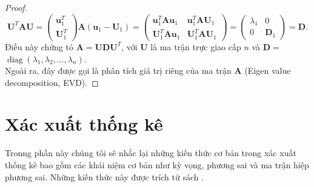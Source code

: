 \documentclass[12pt,a4paper,oneside]{report}
\numberwithin{equation}{section}
\begin{document}
\begin{proof}
	$$
	\mathbf{U}^{T} \mathbf{A} \mathbf{U}=\left(\begin{array}{c}
		\mathbf{u}_{1}^{T} \\
		\mathbf{U}_{1}^{T}
	\end{array}\right) \mathbf{A}\left(\mathbf{u}_{1}-\mathbf{U}_{1}\right)=\left(\begin{array}{cc}
		\mathbf{u}_{1}^{T} \mathbf{A} \mathbf{u}_{1} & \mathbf{u}_{1}^{T} \mathbf{A} \mathbf{U}_{1} \\
		\mathbf{U}_{1}^{T} \mathbf{A} \mathbf{u}_{1} & \mathbf{U}_{1}^{T} \mathbf{A} \mathbf{U}_{1}
	\end{array}\right)=\left(\begin{array}{cc}
		\lambda_{1} & 0 \\
		0 & \mathbf{D}_{1}
	\end{array}\right)=\mathbf{D} .
	$$
	Điều này chứng tỏ $\mathbf{A}=\mathbf{U D U}^{T}$, với $\mathbf{U}$ là ma trận trực giao cấp $n$ và $\mathbf{D}=$ $\operatorname{diag}\left(\lambda_{1}, \lambda_{2}, \ldots, \lambda_{n}\right).$\\
	Ngoài ra, đây được gọi là phân tích giá trị riêng của ma trận $\mathbf{A}$ (Eigen value decomposition, EVD). 
\end{proof}
\section{Xác xuất thống kê}
Tronng phần này chúng tôi sẽ nhắc lại những kiến thức cơ bản trong xác xuất thống kê bao gồm các khái niệm cơ bản như kỳ vọng, phương sai và ma trận hiệp phương sai. Những kiến thức này được trích từ sách \cite{tiep2018}. 
\end{document}
